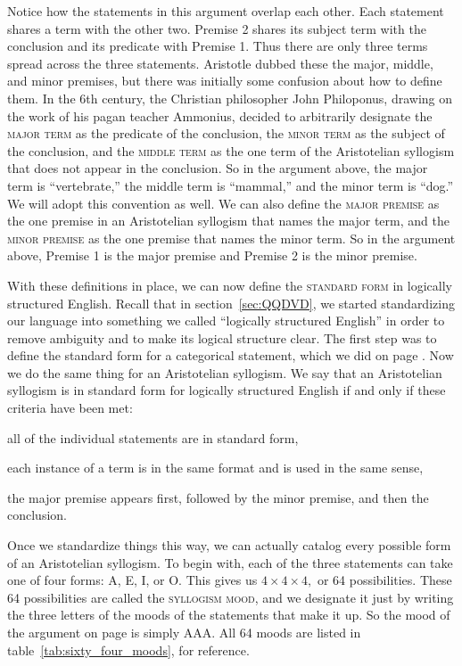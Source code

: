 Notice how the statements in this argument overlap each other. Each statement shares a term with the other two. Premise 2 shares its subject term with the conclusion and its predicate with Premise 1. Thus there are only three terms spread across the three statements. Aristotle dubbed these the major, middle, and minor premises, but there was initially some confusion about how to define them. In the 6th century, the Christian philosopher John Philoponus, drawing on the work of his pagan teacher Ammonius, decided to arbitrarily designate the \textsc{\gls{major term}} as the predicate of the conclusion, the \textsc{\gls{minor term}} as the subject of the conclusion, and the \textsc{\gls{middle term}} as the one term of the Aristotelian syllogism that does not appear in the conclusion. So in the argument above, the major term is ``vertebrate,'' the middle term is ``mammal,'' and the minor term is ``dog.'' We will adopt this convention as well.
We can also define the \textsc{\gls{major premise}} as the one premise in an Aristotelian syllogism that names the major term, and the \textsc{\gls{minor premise}} as the one premise that names the minor term. So in the argument above, Premise 1 is the major premise and Premise 2 is the minor premise.


With these definitions in place, we can now define the \textsc{\gls{standard form}} in logically structured English. Recall that in section~\ref{sec:QQDVD}, we started standardizing our language into something we called ``logically structured English'' in order to remove ambiguity and to make its logical structure clear. The first step was to define the standard form for a categorical statement, which we did on page \pageref{def:standard_form_cat_statement}. Now we do the same thing for an Aristotelian syllogism. We say that an Aristotelian syllogism is in standard form for logically structured English if and only if these criteria have been met: 
\begin{enumerate*}
\item all of the individual statements are in standard form, 
\item each instance of a term is in the same format and is used in the same sense, 
\item the major premise appears first, followed by the minor premise, and then the conclusion.
\end{enumerate*}

Once we standardize things this way, we can actually catalog every possible form of an Aristotelian syllogism. To begin with, each of the three statements can take one of four forms: A, E, I, or O. This gives us $4 \times 4 \times 4,$ or 64 possibilities. These 64 possibilities are called the \textsc{\gls{syllogism mood}}, and we designate it just by writing the three letters of the moods of the statements that make it up. So the mood of the argument on page \pageref{AAA_arg} is simply AAA. All 64 moods are listed in table~\ref{tab:sixty_four_moods}, for reference.

